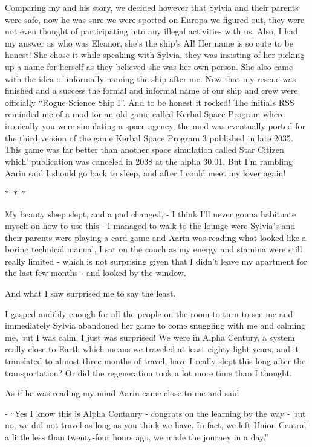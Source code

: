 \documentclass[colorlinks,12pt,a4paper]{book}
\newcommand\sep{\begin{center}
  \boldmath $\ast$~$\ast$~$\ast$
\end{center}}
\begin{document}
 Comparing my and his story, we decided however that Sylvia and their parents were safe, now he was sure we were spotted 
 on Europa we figured out, they were not even thought of participating into any illegal activities with us. Also, I had 
 my answer as who was Eleanor, she's the ship's AI! Her name is so cute to be honest! She chose it while speaking with 
 Sylvia, they was insisting of her picking up a name for herself as they believed she was her own person. She also came 
 with the idea of informally naming the ship after me. Now that my rescue was finished and a success the formal and 
 informal name of our ship and crew were officially “Rogue Science Ship I”. And to be honest it rocked! The initials 
 RSS reminded me of a mod for an old game called Kerbal Space Program where ironically you were simulating a space agency, 
 the mod was eventually ported for the third version of the game Kerbal Space Program 3 published in late 2035. 
 This game was far better than another space simulation called Star Citizen which' publication was canceled in 2038
  at the alpha 30.01. But I'm rambling Aarin said I should go back to sleep, and after I could meet my lover again!
 
 \sep
 
 My beauty sleep slept, and a pad changed, - I think I'll never gonna habituate myself on how to use this - I managed
  to walk to the lounge were Sylvia's and their parents were playing a card game and Aarin was reading what looked 
  like a boring technical manual, I sat on the couch as my energy and stamina were still really limited - which is not 
  surprising given that I didn't leave my apartment for the last few months - and looked by the window.\par
  \bigskip
 
 And what I saw surprised me to say the least. \par
 \bigskip
 
 I gasped audibly enough for all the people on the room to turn to see me and immediately Sylvia abandoned her game to 
 come snuggling with me and calming me, but I was calm, I just was surprised! We were in Alpha Century, a system
  really close to Earth which means we traveled at least eighty light years, and it translated to almost three months of 
  travel, have I really slept this long after the transportation? Or did the regeneration took a lot more time than I 
  thought.\par
  \bigskip
 
 As if he was reading my mind Aarin came close to me and said \par
 \bigskip
 - “Yes I know this is Alpha Centaury - congrats on the learning by the way - but no, we did not travel as long as you
  think we have. In fact, we left Union Central a little less than twenty-four hours ago, we made the journey in a day.”\par
  \bigskip
 
\end{document}
